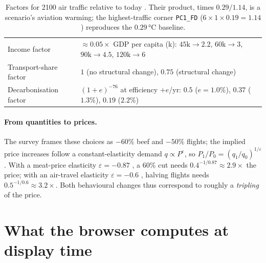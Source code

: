 \documentclass[12pt,a4paper]{article}
\newcommand{\note}[1]{%
  \begin{center}
    \colorbox{yellow!30}{\parbox{0.9\linewidth}{\textbf{Note:} #1}}
  \end{center}}
\newcommand{\scenario}[1]{\texttt{#1}}
\newcommand{\EUR}{\texteuro}
\begin{document}
\begin{table}[ht]
\centering
\caption{Factors for 2100 air traffic relative to today \citep{Smith2026}. Their product, times $0.29/1.14$, is a scenario's aviation warming; the highest-traffic corner \scenario{PC1\_FD} ($6\times1\times0.19=1.14$) reproduces the $0.29$\,°C baseline.}
\label{tab:flights}
\begin{tabular}{ll}
\toprule
Income factor & $\approx 0.05\times$ GDP per capita (k\EUR): $45\text{k}\!\to\!2.2$, $60\text{k}\!\to\!3$, $90\text{k}\!\to\!4.5$, $120\text{k}\!\to\!6$ \\
Transport-share factor & $1$ (no structural change), $0.75$ (structural change) \\
Decarbonisation factor & $(1+e)^{-76}$ at efficiency $+e$/yr: $0.5$ ($e\!=\!1.0\%$), $0.37$ ($1.3\%$), $0.19$ ($2.2\%$) \\
\bottomrule
\end{tabular}
\end{table}

\paragraph{From quantities to prices.} The survey frames these choices as $-60\%$ beef and $-50\%$ flights; the implied price increases follow a constant-elasticity demand $q\propto P^{\varepsilon}$, so $P_1/P_0=(q_1/q_0)^{1/\varepsilon}$. With a meat-price elasticity $\varepsilon=-0.87$ \citep{Gallet2010}, a $60\%$ cut needs $0.4^{-1/0.87}\approx2.9\times$ the price; with an air-travel elasticity $\varepsilon=-0.6$ \citep{InterVistas2007}, halving flights needs $0.5^{-1/0.6}\approx3.2\times$. Both behavioural changes thus correspond to roughly a \emph{tripling} of the price.


\section{What the browser computes at display time}
\label{sec:browser}
\end{document}

